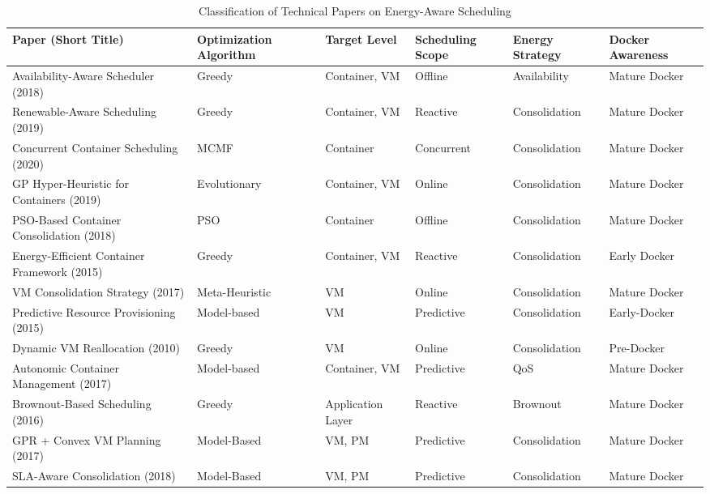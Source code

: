 \begin{table}[H]
\centering
\footnotesize
\begin{tabular}{|p{3.8cm}|p{2.3cm}|p{1.6cm}|p{2.3cm}|p{2.2cm}|p{2cm}|}
\hline
\textbf{Paper (Short Title)} & \textbf{Optimization Algorithm} & \textbf{Target Level} & \textbf{Scheduling Scope} & \textbf{Energy Strategy} & \textbf{Docker Awareness} \\
\hline
Availability-Aware Scheduler\cite{alahmad_availability-aware_2018} (2018) & Greedy & Container, VM & Offline & Availability & Mature Docker\\
\hline
Renewable-Aware Scheduling\cite{kumar_renewable_2019} (2019)& Greedy & Container, VM & Reactive & Consolidation & Mature Docker \\
\hline
Concurrent Container Scheduling\cite{hu_concurrent_2020} (2020)& MCMF & Container & Concurrent & Consolidation & Mature Docker \\
\hline
GP Hyper-Heuristic for Containers\cite{tan_hybrid_2019} (2019)& Evolutionary & Container, VM & Online & Consolidation & Mature Docker \\
\hline
PSO-Based Container Consolidation\cite{shi_energy-aware_2018} (2018)& PSO & Container & Offline & Consolidation & Mature Docker \\
\hline
Energy-Efficient Container Framework\cite{piraghaj_framework_2015} (2015)& Greedy & Container, VM & Reactive & Consolidation & Early Docker \\
\hline
VM Consolidation Strategy\cite{carrega_energy-aware_2017} (2017)& Meta-Heuristic & VM & Online & Consolidation & Mature Docker \\
\hline
Predictive Resource Provisioning\cite{dabbagh_energy-efficient_2015} (2015)& Model-based  & VM & Predictive & Consolidation & Early-Docker \\
\hline
Dynamic VM Reallocation\cite{beloglazov_energy_2010} (2010) & Greedy & VM & Online & Consolidation & Pre-Docker \\
\hline
Autonomic Container Management\cite{barna_delivering_2017} (2017) & Model-based & Container, VM & Predictive & QoS & Mature Docker \\
\hline
Brownout-Based Scheduling\cite{xu_energy_2016} (2016)& Greedy & Application Layer & Reactive & Brownout & Mature Docker \\
\hline
GPR + Convex VM Planning\cite{bui_energy_2017} (2017) & Model-Based & VM, PM & Predictive & Consolidation & Mature Docker \\
\hline
SLA-Aware Consolidation\cite{li_sla-aware_2018} (2018) & Model-Based & VM, PM & Predictive & Consolidation & Mature Docker \\
\hline
\end{tabular}
\caption{Classification of Technical Papers on Energy-Aware Scheduling}
\label{tab:technical_papers}
\end{table}


